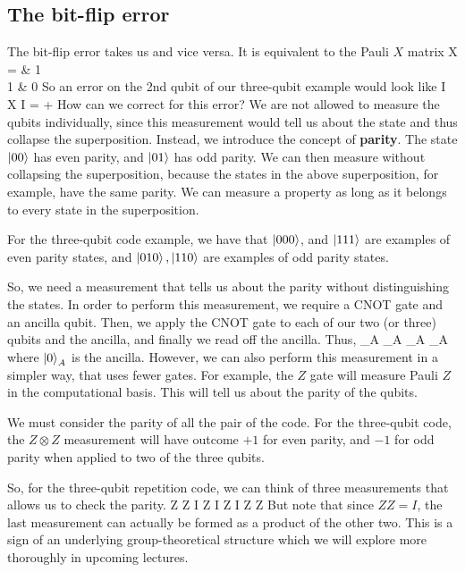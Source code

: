 \subsection{The bit-flip error}
The bit-flip error takes us
\beq
{} \rightarrow {}
\eeq
and vice versa. It is equivalent to the Pauli $X$ matrix
\beq
X =  & 1 \\ 1 & 0\epmat
\eeq
So an error on the 2nd qubit of our three-qubit example would look like
\beq
I \otimes X \otimes I = \alpha {} + \beta {}
\eeq
How can we correct for this error? We are not allowed to measure the qubits individually, since this measurement would tell us about the state and thus collapse the superposition. Instead, we introduce the concept of \textbf{parity}. The state $\ket{00}$ has even parity, and $\ket{01}$ has odd parity. We can then measure without collapsing the superposition, because the states in the above superposition, for example, have the same parity. We can measure a property as long as it belongs to every state in the superposition. 

For the three-qubit code example, we have that $\ket{000}$, and $\ket{111}$ are examples of even parity states, and $\ket{010}, \ket{110}$ are examples of odd parity states. 

So, we need a measurement that tells us about the parity without distinguishing the states. In order to perform this measurement, we require a CNOT gate and an ancilla qubit. Then, we apply the CNOT gate to each of our two (or three) qubits and the ancilla, and finally we read off the ancilla. Thus, 
\beq
{} \rightarrow {}_A
\eeq
\beq
{} \rightarrow {}_A
\eeq
\beq
{} \rightarrow {}_A
\eeq
\beq
{} \rightarrow {}_A
\eeq
where $\ket{0}_A$ is the ancilla. However, we can also perform this measurement in a simpler way, that uses fewer gates. For example, the $Z$ gate will measure Pauli $Z$ in the computational basis. This will tell us about the parity of the qubits. 

We must consider the parity of all the pair of the code. For the three-qubit code, the $Z\otimes Z$ measurement will have outcome $+1$ for even parity, and $-1$ for odd parity when applied to two of the three qubits. 

So, for the three-qubit repetition code, we can think of three measurements that allows us to check the parity. 
\beq
Z \otimes Z \otimes I
\eeq
\beq
Z \otimes I \otimes Z
\eeq
\beq
I \otimes Z \otimes Z
\eeq
But note that since $ZZ = I$, the last measurement can actually be formed as a product of the other two. This is a sign of an underlying group-theoretical structure which we will explore more thoroughly in upcoming lectures. 

